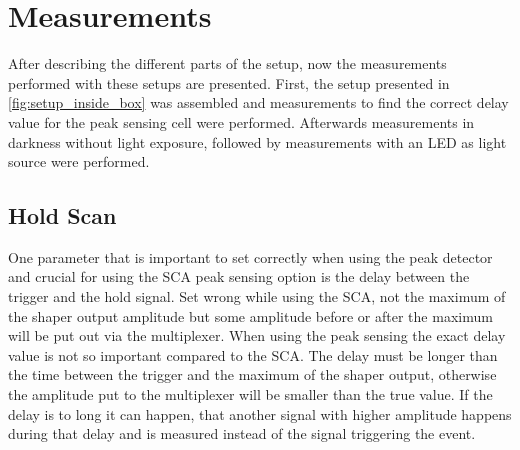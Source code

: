 \chapter{Measurements}

After describing the different parts of the setup, now the measurements performed with these setups are presented. First, the setup presented in \autoref{fig:setup_inside_box} was assembled and measurements to find the correct delay value for the peak sensing cell were performed. Afterwards measurements in darkness without light exposure, followed by measurements with an LED as light source were performed.



\FloatBarrier
\section{Hold Scan}
One parameter that is important to set correctly when using the peak detector and crucial for using the SCA peak sensing option is the delay between the trigger and the hold signal. 
Set wrong while using the SCA, not the maximum of the shaper output amplitude but some amplitude before or after the maximum will be put out via the multiplexer. 
When using the peak sensing the exact delay value is not so important compared to the SCA. 
The delay must be longer than the time between the trigger and the maximum of the shaper output, otherwise the amplitude put to the multiplexer will be smaller than the true value. 
If the delay is to long it can happen, that another signal with higher amplitude happens during that delay and is measured instead of the signal triggering the event. 

